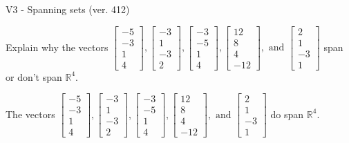 \begin{exercise}
  \begin{exerciseTitle}V3 - Spanning sets (ver. 412)\end{exerciseTitle}
  \begin{exerciseStatement}
    Explain why the vectors \(\left[\begin{array}{r}
-5 \\
-3 \\
1 \\
4
\end{array}\right] , \left[\begin{array}{r}
-3 \\
1 \\
-3 \\
2
\end{array}\right] , \left[\begin{array}{r}
-3 \\
-5 \\
1 \\
4
\end{array}\right] , \left[\begin{array}{r}
12 \\
8 \\
4 \\
-12
\end{array}\right] , \text{ and } \left[\begin{array}{r}
2 \\
1 \\
-3 \\
1
\end{array}\right]\) span or don't span \(\mathbb{R}^4\). 
	


  \end{exerciseStatement}
  \begin{exerciseAnswer}
   The vectors \(\left[\begin{array}{r}
-5 \\
-3 \\
1 \\
4
\end{array}\right] , \left[\begin{array}{r}
-3 \\
1 \\
-3 \\
2
\end{array}\right] , \left[\begin{array}{r}
-3 \\
-5 \\
1 \\
4
\end{array}\right] , \left[\begin{array}{r}
12 \\
8 \\
4 \\
-12
\end{array}\right] , \text{ and } \left[\begin{array}{r}
2 \\
1 \\
-3 \\
1
\end{array}\right]\) 
  	 do  
	span \(\mathbb{R}^4\).
  



\end{exerciseAnswer}
\end{exercise}
